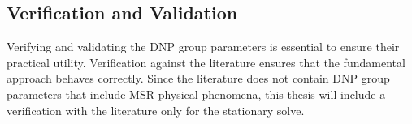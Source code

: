 \subsection{Verification and Validation}
Verifying and validating the \gls{DNP} group parameters is essential to ensure their practical utility.
Verification against the literature ensures that the fundamental approach behaves correctly.
Since the literature does not contain \gls{DNP} group parameters that include \gls{MSR} physical phenomena, this thesis will include a verification with the literature only for the stationary solve.

